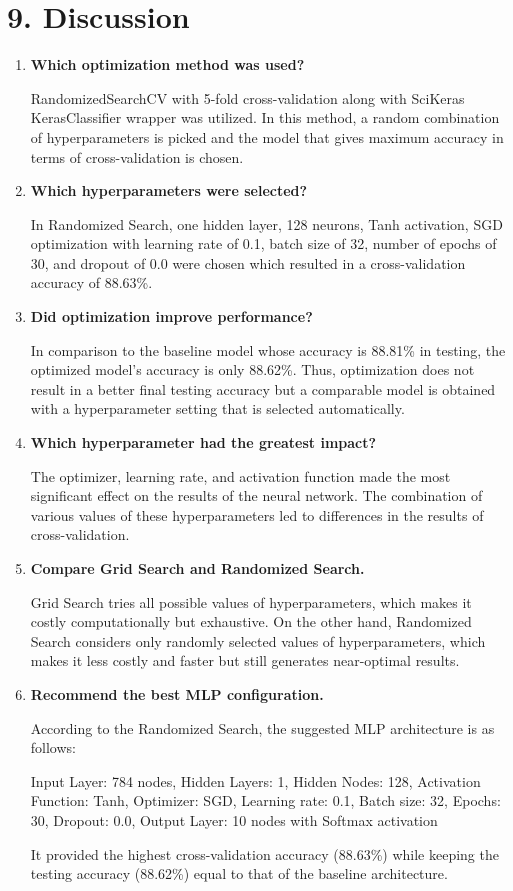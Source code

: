 \documentclass[11pt]{article}
\begin{document}
\section*{9. Discussion}

\begin{enumerate}[leftmargin=*]
\item \textbf{Which optimization method was used?}

RandomizedSearchCV with 5-fold cross-validation along with SciKeras KerasClassifier wrapper was utilized. In this method, a random combination of hyperparameters is picked and the model that gives maximum accuracy in terms of cross-validation is chosen.

\item \textbf{Which hyperparameters were selected?}

In Randomized Search, one hidden layer, 128 neurons, Tanh activation, SGD optimization with learning rate of 0.1, batch size of 32, number of epochs of 30, and dropout of 0.0 were chosen which resulted in a cross-validation accuracy of 88.63\%.

\item \textbf{Did optimization improve performance?}

In comparison to the baseline model whose accuracy is 88.81\% in testing, the optimized model's accuracy is only 88.62\%. Thus, optimization does not result in a better final testing accuracy but a comparable model is obtained with a hyperparameter setting that is selected automatically.

\item \textbf{Which hyperparameter had the greatest impact?}

The optimizer, learning rate, and activation function made the most significant effect on the results of the neural network. The combination of various values of these hyperparameters led to differences in the results of cross-validation.

\item \textbf{Compare Grid Search and Randomized Search.}

Grid Search tries all possible values of hyperparameters, which makes it costly computationally but exhaustive. On the other hand, Randomized Search considers only randomly selected values of hyperparameters, which makes it less costly and faster but still generates near-optimal results.

\item \textbf{Recommend the best MLP configuration.}

According to the Randomized Search, the suggested MLP architecture is as follows:

Input Layer: 784 nodes,
Hidden Layers: 1,
Hidden Nodes: 128,
Activation Function: Tanh,
Optimizer: SGD,
Learning rate: 0.1,
Batch size: 32,
Epochs: 30,
Dropout: 0.0,
Output Layer: 10 nodes with Softmax activation

It provided the highest cross-validation accuracy (88.63\%) while keeping the testing accuracy (88.62\%) equal to that of the baseline architecture.

\end{enumerate}
\end{document}
